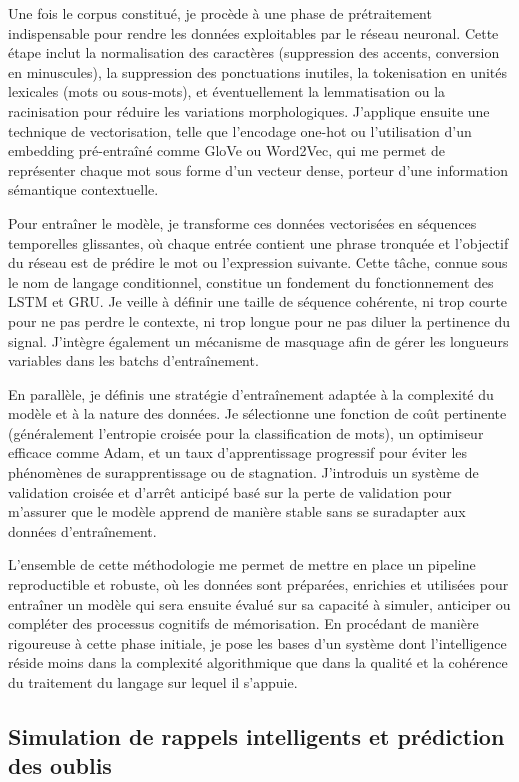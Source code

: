 \documentclass[11pt,a4paper]{report}
\begin{document}
Une fois le corpus constitué, je procède à une phase de prétraitement indispensable pour rendre les données exploitables par le réseau neuronal. Cette étape inclut la normalisation des caractères (suppression des accents, conversion en minuscules), la suppression des ponctuations inutiles, la tokenisation en unités lexicales (mots ou sous-mots), et éventuellement la lemmatisation ou la racinisation pour réduire les variations morphologiques. J’applique ensuite une technique de vectorisation, telle que l’encodage one-hot ou l’utilisation d’un embedding pré-entraîné comme GloVe ou Word2Vec, qui me permet de représenter chaque mot sous forme d’un vecteur dense, porteur d’une information sémantique contextuelle.

Pour entraîner le modèle, je transforme ces données vectorisées en séquences temporelles glissantes, où chaque entrée contient une phrase tronquée et l’objectif du réseau est de prédire le mot ou l’expression suivante. Cette tâche, connue sous le nom de langage conditionnel, constitue un fondement du fonctionnement des LSTM et GRU. Je veille à définir une taille de séquence cohérente, ni trop courte pour ne pas perdre le contexte, ni trop longue pour ne pas diluer la pertinence du signal. J’intègre également un mécanisme de masquage afin de gérer les longueurs variables dans les batchs d’entraînement.

En parallèle, je définis une stratégie d’entraînement adaptée à la complexité du modèle et à la nature des données. Je sélectionne une fonction de coût pertinente (généralement l’entropie croisée pour la classification de mots), un optimiseur efficace comme Adam, et un taux d’apprentissage progressif pour éviter les phénomènes de surapprentissage ou de stagnation. J’introduis un système de validation croisée et d’arrêt anticipé basé sur la perte de validation pour m’assurer que le modèle apprend de manière stable sans se suradapter aux données d’entraînement.

L’ensemble de cette méthodologie me permet de mettre en place un pipeline reproductible et robuste, où les données sont préparées, enrichies et utilisées pour entraîner un modèle qui sera ensuite évalué sur sa capacité à simuler, anticiper ou compléter des processus cognitifs de mémorisation. En procédant de manière rigoureuse à cette phase initiale, je pose les bases d’un système dont l’intelligence réside moins dans la complexité algorithmique que dans la qualité et la cohérence du traitement du langage sur lequel il s’appuie.

\subsection{Simulation de rappels intelligents et prédiction des oublis}
\end{document}
